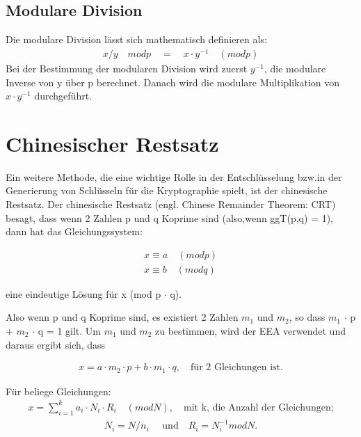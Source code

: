 \subsection{Modulare Division}

Die modulare Division lässt sich mathematisch definieren als:
\begin{align*}
    x/y \quad mod p \quad = \quad x \cdot y^{-1} \quad (mod p)
\end{align*}
Bei der Bestimmung der modularen Division wird zuerst $ y^{-1}$, die modulare Inverse von y über p berechnet. Danach wird die modulare Multiplikation von $ x \cdot y^{-1} $ durchgeführt.  

\section{Chinesischer Restsatz}

Ein weitere Methode, die eine wichtige Rolle in der
Entschlüsselung bzw.in der Generierung von Schlüsseln für die
Kryptographie spielt, ist der chinesische Restsatz.
Der chinesische Restsatz (engl. Chinese Remainder Theorem: CRT) besagt, dass wenn 2 Zahlen p und q Koprime
sind (also,wenn ggT(p,q) = 1), dann hat das Gleichungssystem:

\begin{ceqn}
\begin{align*}
      x \equiv a \quad (mod     p) \\
      x \equiv b \quad (mod     q) 
\end{align*}
\end{ceqn}
eine eindeutige Lösung für x (mod p $\cdot$ q). 

Also wenn p und q Koprime sind, es existiert 2 Zahlen $ m_1 $ und $ m_2 $, so dass $ m_1 $ $\cdot$ p + $ m_2 $ $\cdot $ q = 1 gilt. Um $ m_1 $ und  $ m_2 $ zu bestimmen, wird der EEA verwendet und daraus ergibt sich, dass

\begin{ceqn}
   \begin{align*}
       x = a \cdot m_2 \cdot p + b \cdot m_1 \cdot q, \quad \text{für 2 Gleichungen ist.}
   \end{align*}
\end{ceqn}
Für beliege Gleichungen:
\begin{align}
     x = \sum_{i=1}^{k} a_i \cdot N_i \cdot R_i \quad (mod N), \quad \text{mit k, die Anzahl der Gleichungen;}
     \label{crt}
\end{align}
\begin{align*}
     N_i = N/n_i \quad \text{ und} \quad R_i = N_i^{-1} mod N.
\end{align*}

